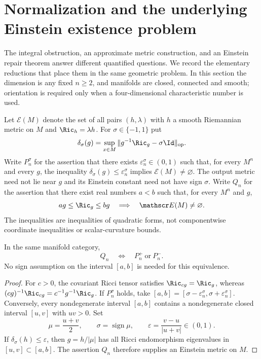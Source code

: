 \section{Normalization and the underlying Einstein existence problem}
\label{sec:normalized-existence}

The integral obstruction, an approximate metric construction, and an
Einstein repair theorem answer different quantified questions. We record
the elementary reductions that place them in the same geometric problem.
In this section the dimension is any fixed $n\ge2$, and manifolds are
closed, connected and smooth; orientation is required only when a
four-dimensional characteristic number is used.

Let $\mathscr E(M)$ denote the set of all pairs $(h,\lambda)$ with
$h$ a smooth Riemannian metric on $M$ and $\Ric_h=\lambda h$.
For $\sigma\in\{-1,1\}$ put
\[
 \delta_\sigma(g)=
 \sup_{x\in M}\|g^{-1}\Ric_g-\sigma\Id\|_{\mathrm{op}}.
\]
Write $P_n^\sigma$ for the assertion that there exists
$\varepsilon_n^\sigma\in(0,1)$ such that, for every $M^n$ and every
$g$, the inequality $\delta_\sigma(g)\le\varepsilon_n^\sigma$ implies
$\mathscr E(M)\ne\varnothing$. The output metric need not lie near $g$
and its Einstein constant need not have sign $\sigma$.
Write $Q_n$ for the assertion that there exist real numbers $a<b$
such that, for every $M^n$ and $g$,
\[
 ag\le\Ric_g\le bg\quad\Longrightarrow\quad
 \mathscr E(M)\ne\varnothing.
\]
The inequalities are inequalities of quadratic forms, not componentwise
coordinate inequalities or scalar-curvature bounds.

\begin{proposition}
\label{prop:normalized-branches}
In the same manifold category,
\[
 Q_n\quad\Longleftrightarrow\quad P_n^+\ \text{or}\ P_n^-.
\]
No sign assumption on the interval $[a,b]$ is needed for this equivalence.
\end{proposition}
\begin{proof}
For $c>0$, the covariant Ricci tensor satisfies
$\Ric_{cg}=\Ric_g$, whereas
$(cg)^{-1}\Ric_{cg}=c^{-1}g^{-1}\Ric_g$.
If $P_n^\sigma$ holds, take
$[a,b]=[\sigma-\varepsilon_n^\sigma,
\sigma+\varepsilon_n^\sigma]$.
Conversely, every nondegenerate interval $[a,b]$ contains a
nondegenerate closed interval $[u,v]$ with $uv>0$.
Set
\[
 \mu=\frac{u+v}{2},\qquad
 \sigma=\operatorname{sign}\mu,\qquad
 \varepsilon=\frac{v-u}{|u+v|}\in(0,1).
\]
If $\delta_\sigma(h)\le\varepsilon$, then $g=h/|\mu|$ has all
Ricci endomorphism eigenvalues in $[u,v]\subset[a,b]$.
The assertion $Q_n$ therefore supplies an Einstein metric on $M$.
\end{proof}


